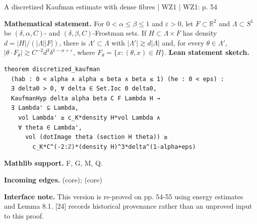 \documentclass[10pt,a4paper]{article}
\newcommand{\nodecard}[1]{\hyperlink{node-#1}{\texttt{\detokenize{#1}}}}
\begin{document}
\begin{minipage}{\linewidth}
\hypertarget{node-T8_2}{}
\begin{tcolorbox}[colback=white,colframe=radialfg,colbacktitle=radialbg,coltitle=ink,boxrule=0.45pt,arc=1.6mm,left=3mm,right=3mm,top=2mm,bottom=2mm,title={\sffamily\bfseries WZ1 Theorem 8.2 \hfill \texttt{T8\_2}}]
{\sffamily\small\color{muted}A discretized Kaufman estimate with dense fibres | WZ1 | WZ1: p. 54}\par
\textbf{Mathematical statement.} For $0<\alpha\le\beta\le1$ and $\varepsilon>0$, let $F\subset\mathbb R^2$ and $\Lambda\subset S^1$ be $(\delta,\alpha,C)$- and $(\delta,\beta,C)$-Frostman sets.
If $H\subset\Lambda\times F$ has density $d=|H|/(|\Lambda||F|)$, there is $\Lambda'\subset\Lambda$ with $|\Lambda'|\gtrsim d|\Lambda|$ and, for every $\theta\in\Lambda'$,
$|\theta\cdot F_\theta|\gtrsim C^{-2}d^3\delta^{1-\alpha+\varepsilon}$, where $F_\theta=\{x:(\theta,x)\in H\}$.
\smallskip\textbf{Lean statement sketch.}
\begin{Verbatim}[fontsize=\small,breaklines=true,breakanywhere=true,tabsize=2]
theorem discretized_kaufman
  (hab : 0 < alpha ∧ alpha ≤ beta ∧ beta ≤ 1) (he : 0 < eps) :
  ∃ delta0 > 0, ∀ delta ∈ Set.Ioc 0 delta0,
  KaufmanHyp delta alpha beta C F Lambda H →
  ∃ Lambda' ⊆ Lambda,
    vol Lambda' ≥ c_K*density H*vol Lambda ∧
    ∀ theta ∈ Lambda',
      vol (dotImage theta (section H theta)) ≥
        c_K*C^(-2:ℤ)*(density H)^3*delta^(1-alpha+eps)
\end{Verbatim}
{\footnotesize\textbf{Mathlib support.} F, G, M, Q.\par
\textbf{Incoming edges.} \nodecard{L8_1} (core); \nodecard{DFrost} (core)\par}
{\footnotesize\textbf{Interface note.} This version is re-proved on pp. 54-55 using energy estimates and Lemma 8.1. [24] records historical provenance rather than an unproved input to this proof.}
\end{tcolorbox}\end{minipage}\par\medskip
\end{document}
